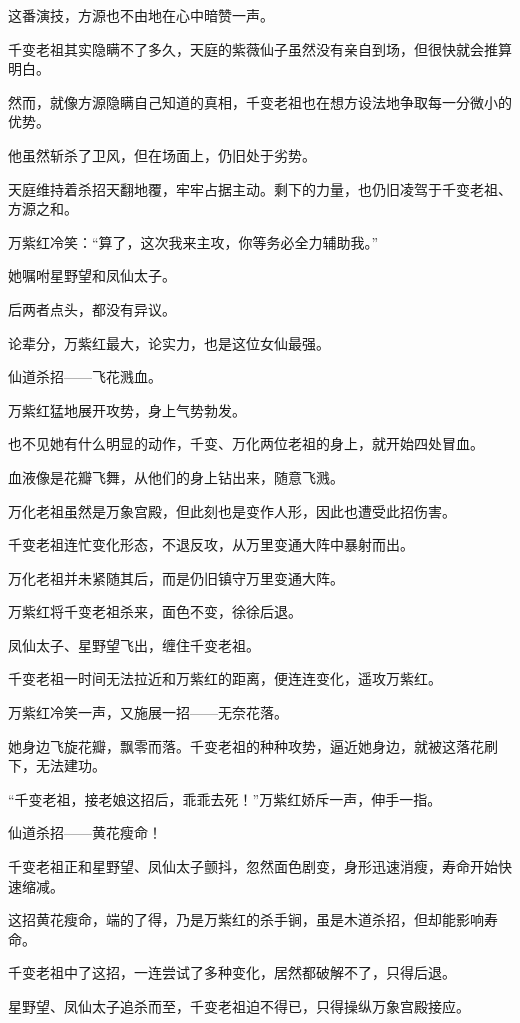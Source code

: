 \begin{this_body}
这番演技，方源也不由地在心中暗赞一声。

千变老祖其实隐瞒不了多久，天庭的紫薇仙子虽然没有亲自到场，但很快就会推算明白。

然而，就像方源隐瞒自己知道的真相，千变老祖也在想方设法地争取每一分微小的优势。

他虽然斩杀了卫风，但在场面上，仍旧处于劣势。

天庭维持着杀招天翻地覆，牢牢占据主动。剩下的力量，也仍旧凌驾于千变老祖、方源之和。

万紫红冷笑：“算了，这次我来主攻，你等务必全力辅助我。”

她嘱咐星野望和凤仙太子。

后两者点头，都没有异议。

论辈分，万紫红最大，论实力，也是这位女仙最强。

仙道杀招——飞花溅血。

万紫红猛地展开攻势，身上气势勃发。

也不见她有什么明显的动作，千变、万化两位老祖的身上，就开始四处冒血。

血液像是花瓣飞舞，从他们的身上钻出来，随意飞溅。

万化老祖虽然是万象宫殿，但此刻也是变作人形，因此也遭受此招伤害。

千变老祖连忙变化形态，不退反攻，从万里变通大阵中暴射而出。

万化老祖并未紧随其后，而是仍旧镇守万里变通大阵。

万紫红将千变老祖杀来，面色不变，徐徐后退。

凤仙太子、星野望飞出，缠住千变老祖。

千变老祖一时间无法拉近和万紫红的距离，便连连变化，遥攻万紫红。

万紫红冷笑一声，又施展一招——无奈花落。

她身边飞旋花瓣，飘零而落。千变老祖的种种攻势，逼近她身边，就被这落花刷下，无法建功。

“千变老祖，接老娘这招后，乖乖去死！”万紫红娇斥一声，伸手一指。

仙道杀招——黄花瘦命！

千变老祖正和星野望、凤仙太子颤抖，忽然面色剧变，身形迅速消瘦，寿命开始快速缩减。

这招黄花瘦命，端的了得，乃是万紫红的杀手锏，虽是木道杀招，但却能影响寿命。

千变老祖中了这招，一连尝试了多种变化，居然都破解不了，只得后退。

星野望、凤仙太子追杀而至，千变老祖迫不得已，只得操纵万象宫殿接应。


\end{this_body}
